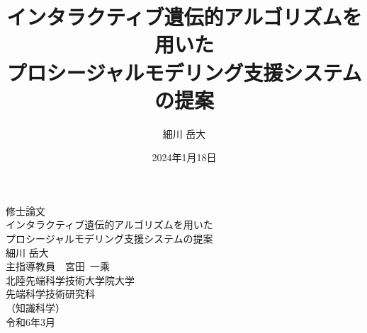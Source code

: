 \documentclass[12pt,a4j]{bxjsreport}
\title{インタラクティブ遺伝的アルゴリズムを用いた\\
プロシージャルモデリング支援システムの提案}
\author{細川 岳大}
\date{2024年1月18日}
\begin{document}
\thispagestyle{empty}
\begin{center}
 修士論文\\%
\vfill
インタラクティブ遺伝的アルゴリズムを用いた\\
プロシージャルモデリング支援システムの提案\\
\vfill
細川 岳大\\
\vfill
主指導教員\ \ 宮田\ 一乘\\
\vfill
北陸先端科学技術大学院大学\\
先端科学技術研究科\\
（知識科学）\\ %
\vfill
令和6年3月\\ %
\vfill
\end{center}
\clearpage



\tableofcontents
\listoffigures
\listoftables


\clearpage


\clearpage


\clearpage


\clearpage


\clearpage


\clearpage



\clearpage
%
%





\end{document}
